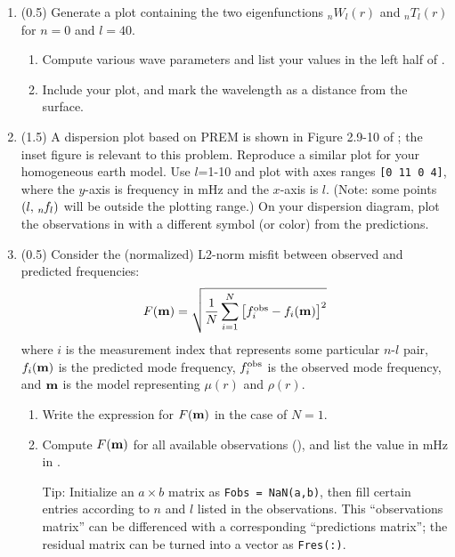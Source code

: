 \documentclass[11pt,titlepage,fleqn]{article}
\newcommand{\Tnl}{\mbox{${}_nT_l$}}
\newcommand{\Wnl}{\mbox{${}_nW_l$}}
\newcommand{\fnl}{\mbox{${}_{n\hspace{-0.2 mm}}f_l$}}
\begin{document}
\begin{enumerate}

\item (0.5) Generate a plot containing the two eigenfunctions $\Wnl(r)$ and $\Tnl(r)$ for $n=0$ and $l=40$.
%
\begin{enumerate}
\item Compute various wave parameters and list your values in the left half of .
\item Include your plot, and mark the wavelength as a distance from the surface.
\end{enumerate}

\label{prob:0T40_homo}


\item (1.5) A dispersion plot based on PREM is shown in Figure 2.9-10 of \citet{SteinWysession}; the inset figure is relevant to this problem. Reproduce a similar plot for your homogeneous earth model. Use $l$=1-10 and plot with axes ranges \verb+[0 11 0 4]+, where the $y$-axis is frequency in mHz and the $x$-axis is $l$. (Note: some points $(l,\,\fnl)$ will be outside the plotting range.) On your dispersion diagram, plot the observations in  with a different symbol (or color) from the predictions.
\label{prob:disp}


\item (0.5) Consider the (normalized) L2-norm misfit between observed and predicted frequencies:
%
\begin{equation}
F(\mbox{${\bf m}$}) = \sqrt{ \frac{1}{N} \sum_{i=1}^N \left[f_i^{\rm obs} - f_i(\mbox{${\bf m}$})\right]^2 }
\label{Fm}
\end{equation}
%
where $i$ is the measurement index that represents some particular $n$-$l$ pair, $f_i(\mbox{${\bf m}$})$ is the predicted mode frequency, $f_i^{\rm obs}$ is the observed mode frequency, and $\mbox{${\bf m}$}$ is the model representing $\mu(r)$ and $\rho(r)$.

\begin{enumerate}
\item Write the expression for $F(\mbox{${\bf m}$})$ in the case of $N=1$.

\item Compute $F(\mbox{${\bf m}$})$ for all available observations (), and list the value in mHz in .

Tip: Initialize an $a \times b$ matrix as \verb+Fobs = NaN(a,b)+, then fill certain entries according to $n$ and $l$ listed in the observations. This ``observations matrix'' can be differenced with a corresponding ``predictions matrix''; the residual matrix can be turned into a vector as \verb+Fres(:)+.

\end{enumerate}

\label{prob:Fm}

\end{enumerate}
\end{document}
